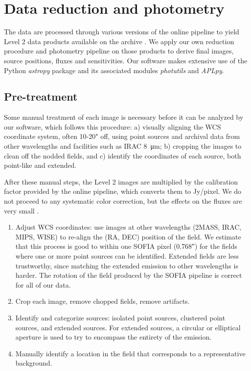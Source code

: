 \section{Data reduction and photometry}

The data are processed through various versions of the online pipeline to yield Level 2 data products available on the archive \citep{Herter:2013by}. We apply our own reduction procedure and photometry pipeline on those products to derive final images, source positions, fluxes and sensitivities. Our software makes extensive use of the Python \textit{astropy} package \citep{2013A&A...558A..33A} and its associated modules \textit{photutils} and \textit{APLpy}. 

\subsection{Pre-treatment}
Some manual treatment of each image is necessary before it can be analyzed by our software, which follows this procedure: a) visually aligning the WCS coordinate system, often 10-20" off, using point sources and archival data from other wavelengths and facilities such as IRAC \SI{8}{\micro\meter}; b) cropping the images to clean off the nodded fields, and c) identify the coordinates of each source, both point-like and extended.

After these manual steps, the Level 2 images are multiplied by the calibration factor provided by the online pipeline, which converts them to Jy/pixel. We do not proceed to any systematic color correction, but the effects on the fluxes are very small \citep{Herter:2013by}.
\begin{enumerate}
\item Adjust WCS coordinates: use images at other wavelengths (2MASS, IRAC, MIPS, WISE) to re-align the (RA, DEC) position of the field. We estimate that this process is good to within one SOFIA pixel (\ang{;;0.768}) for the fields where one or more point sources can be identified. Extended fields are less trustworthy, since matching the extended emission to other wavelengths is harder. The rotation of the field produced by the SOFIA pipeline is correct for all of our data. 
\item Crop each image, remove chopped fields, remove artifacts.
\item Identify and categorize sources: isolated point sources, clustered point sources, and extended sources. For extended sources, a circular or elliptical aperture is used to try to encompass the entirety of the emission.
\item Manually identify a location in the field that corresponds to a representative background.
\end{enumerate}

